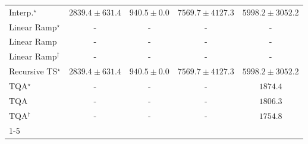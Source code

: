 \begin{tabular}{l|cccc|}
Interp.$^\star$ & {\cellcolor[HTML]{C4CBE3}} \color[HTML]{000000} $2839.4\pm 631.4$ & {\cellcolor[HTML]{FFF7FB}} \color[HTML]{000000} $940.5\pm 0.0$ & {\cellcolor[HTML]{023858}} \color[HTML]{F1F1F1} $7569.7\pm 4127.3$ & {\cellcolor[HTML]{056DAC}} \color[HTML]{F1F1F1} $5998.2\pm 3052.2$ \\
Linear Ramp$^\star$ & {\cellcolor[HTML]{000000}} \color[HTML]{F1F1F1} {\cellcolor{white}} \color{black} - & {\cellcolor[HTML]{000000}} \color[HTML]{F1F1F1} {\cellcolor{white}} \color{black} - & {\cellcolor[HTML]{000000}} \color[HTML]{F1F1F1} {\cellcolor{white}} \color{black} - & {\cellcolor[HTML]{000000}} \color[HTML]{F1F1F1} {\cellcolor{white}} \color{black} - \\
Linear Ramp & {\cellcolor[HTML]{000000}} \color[HTML]{F1F1F1} {\cellcolor{white}} \color{black} - & {\cellcolor[HTML]{000000}} \color[HTML]{F1F1F1} {\cellcolor{white}} \color{black} - & {\cellcolor[HTML]{000000}} \color[HTML]{F1F1F1} {\cellcolor{white}} \color{black} - & {\cellcolor[HTML]{000000}} \color[HTML]{F1F1F1} {\cellcolor{white}} \color{black} - \\
Linear Ramp$^\dagger$ & {\cellcolor[HTML]{000000}} \color[HTML]{F1F1F1} {\cellcolor{white}} \color{black} - & {\cellcolor[HTML]{000000}} \color[HTML]{F1F1F1} {\cellcolor{white}} \color{black} - & {\cellcolor[HTML]{000000}} \color[HTML]{F1F1F1} {\cellcolor{white}} \color{black} - & {\cellcolor[HTML]{000000}} \color[HTML]{F1F1F1} {\cellcolor{white}} \color{black} - \\
Recursive TS$^\star$ & {\cellcolor[HTML]{C4CBE3}} \color[HTML]{000000} $2839.4\pm 631.4$ & {\cellcolor[HTML]{FFF7FB}} \color[HTML]{000000} $940.5\pm 0.0$ & {\cellcolor[HTML]{023858}} \color[HTML]{F1F1F1} $7569.7\pm 4127.3$ & {\cellcolor[HTML]{056DAC}} \color[HTML]{F1F1F1} $5998.2\pm 3052.2$ \\
TQA$^\star$ & {\cellcolor[HTML]{000000}} \color[HTML]{F1F1F1} {\cellcolor{white}} \color{black} - & {\cellcolor[HTML]{000000}} \color[HTML]{F1F1F1} {\cellcolor{white}} \color{black} - & {\cellcolor[HTML]{000000}} \color[HTML]{F1F1F1} {\cellcolor{white}} \color{black} - & {\cellcolor[HTML]{E8E4F0}} \color[HTML]{000000} $1874.4$ \\
TQA & {\cellcolor[HTML]{000000}} \color[HTML]{F1F1F1} {\cellcolor{white}} \color{black} - & {\cellcolor[HTML]{000000}} \color[HTML]{F1F1F1} {\cellcolor{white}} \color{black} - & {\cellcolor[HTML]{000000}} \color[HTML]{F1F1F1} {\cellcolor{white}} \color{black} - & {\cellcolor[HTML]{EBE6F2}} \color[HTML]{000000} $1806.3$ \\
TQA$^\dagger$ & {\cellcolor[HTML]{000000}} \color[HTML]{F1F1F1} {\cellcolor{white}} \color{black} - & {\cellcolor[HTML]{000000}} \color[HTML]{F1F1F1} {\cellcolor{white}} \color{black} - & {\cellcolor[HTML]{000000}} \color[HTML]{F1F1F1} {\cellcolor{white}} \color{black} - & {\cellcolor[HTML]{EDE7F2}} \color[HTML]{000000} $1754.8$ \\
\cline{1-5}
\bottomrule
\end{tabular}
